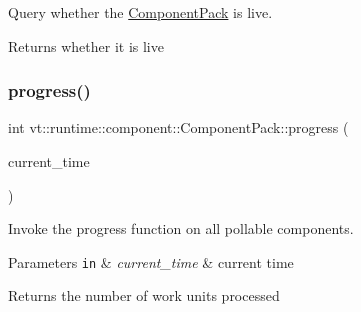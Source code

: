 Query whether the {\ttfamily \hyperlink{structvt_1_1runtime_1_1component_1_1_component_pack}{Component\+Pack}} is live. 

\begin{DoxyReturn}{Returns}
whether it is live 
\end{DoxyReturn}
\mbox{\label{structvt_1_1runtime_1_1component_1_1_component_pack_a618c94b245df9fa59979ecfb116866c2}} 
\subsubsection{\texorpdfstring{progress()}{progress()}}
{\footnotesize\ttfamily int vt\+::runtime\+::component\+::\+Component\+Pack\+::progress (\begin{DoxyParamCaption}\item[{\hyperlink{namespacevt_a876a9d0cd5a952859c72de8a46881442}{Time\+Type}}]{current\+\_\+time }\end{DoxyParamCaption})}



Invoke the progress function on all pollable components. 


\begin{DoxyParams}[1]{Parameters}
\mbox{\tt in}  & {\em current\+\_\+time} & current time\\
\hline
\end{DoxyParams}
\begin{DoxyReturn}{Returns}
the number of work units processed 
\end{DoxyReturn}
\mbox{\label{structvt_1_1runtime_1_1component_1_1_component_pack_a956437fba91b2b90576df33276858df5}} 
